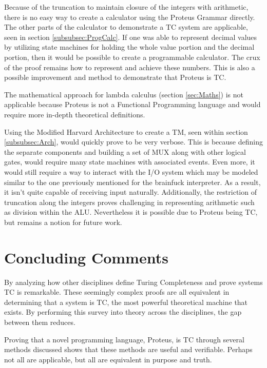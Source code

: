 Because of the truncation to maintain closure of the integers with arithmetic, there is no easy way to create a calculator using the Proteus Grammar directly.
The other parts of the calculator to demonstrate a TC system are applicable, seen in section \ref{subsubsec:ProgCalc}.
If one was able to represent decimal values by utilizing state machines for holding the whole value portion and the decimal portion, then it would be possible to create a programmable calculator.
The crux of the proof remains how to represent and achieve these numbers.
This is also a possible improvement and method to demonstrate that Proteus is TC.

The mathematical approach for lambda calculus (section \ref{sec:Maths}) is not applicable because Proteus is not a Functional Programming language and would require more in-depth theoretical definitions.

Using the Modified Harvard Architecture to create a TM, seen within section \ref{subsubsec:Arch}, would quickly prove to be very verbose.
This is because defining the separate components and building a set of MUX along with other logical gates, would require many state machines with associated events.
Even more, it would still require a way to interact with the I/O system which may be modeled similar to the one previously mentioned for the brainfuck interpreter.
As a result, it isn't quite capable of receiving input naturally.
Additionally, the restriction of truncation along the integers proves challenging in representing arithmetic such as division within the ALU.
Nevertheless it is possible due to Proteus being TC, but remains a notion for future work.

\section{Concluding Comments}\label{sec:ConclComm}

By analyzing how other disciplines define Turing Completeness and prove systems TC is remarkable.
These seemingly complex proofs are all equivalent in determining that a system is TC, the most powerful theoretical machine that exists.
By performing this survey into theory across the disciplines, the gap between them reduces.

Proving that a novel programming language, Proteus, is TC through several methods discussed shows that these methods are useful and verifiable.
Perhaps not all are applicable, but all are equivalent in purpose and truth.
